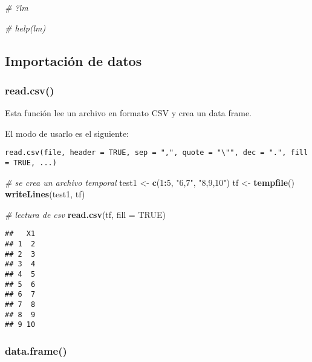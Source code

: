 \documentclass[11pt,]{article}
\newenvironment{Shaded}{\begin{snugshade}}{\end{snugshade}}
\newcommand{\CommentTok}[1]{\textcolor[rgb]{0.56,0.35,0.01}{\textit{#1}}}
\newcommand{\DataTypeTok}[1]{\textcolor[rgb]{0.13,0.29,0.53}{#1}}
\newcommand{\DecValTok}[1]{\textcolor[rgb]{0.00,0.00,0.81}{#1}}
\newcommand{\KeywordTok}[1]{\textcolor[rgb]{0.13,0.29,0.53}{\textbf{#1}}}
\newcommand{\NormalTok}[1]{#1}
\newcommand{\OperatorTok}[1]{\textcolor[rgb]{0.81,0.36,0.00}{\textbf{#1}}}
\newcommand{\OtherTok}[1]{\textcolor[rgb]{0.56,0.35,0.01}{#1}}
\newcommand{\StringTok}[1]{\textcolor[rgb]{0.31,0.60,0.02}{#1}}
\begin{document}
\begin{Shaded}
\begin{Highlighting}[]
\CommentTok{# ?lm}

\CommentTok{# help(lm)}
\end{Highlighting}
\end{Shaded}

\hypertarget{importaciuxf3n-de-datos}{%
\subsection{Importación de datos}\label{importaciuxf3n-de-datos}}

\hypertarget{read.csv}{%
\subsubsection{read.csv()}\label{read.csv}}

Esta función lee un archivo en formato CSV y crea un data frame.

El modo de usarlo es el siguiente:

\begin{verbatim}
read.csv(file, header = TRUE, sep = ",", quote = "\"", dec = ".", fill = TRUE, ...)
\end{verbatim}

\begin{Shaded}
\begin{Highlighting}[]
\CommentTok{# se crea un archivo temporal}
\NormalTok{test1 <-}\StringTok{ }\KeywordTok{c}\NormalTok{(}\DecValTok{1}\OperatorTok{:}\DecValTok{5}\NormalTok{, }\StringTok{"6,7"}\NormalTok{, }\StringTok{"8,9,10"}\NormalTok{)}
\NormalTok{tf <-}\StringTok{ }\KeywordTok{tempfile}\NormalTok{()}
\KeywordTok{writeLines}\NormalTok{(test1, tf)}

\CommentTok{# lectura de csv}
\KeywordTok{read.csv}\NormalTok{(tf, }\DataTypeTok{fill =} \OtherTok{TRUE}\NormalTok{)}
\end{Highlighting}
\end{Shaded}

\begin{verbatim}
##   X1
## 1  2
## 2  3
## 3  4
## 4  5
## 5  6
## 6  7
## 7  8
## 8  9
## 9 10
\end{verbatim}

\hypertarget{data.frame}{%
\subsubsection{data.frame()}\label{data.frame}}
\end{document}

